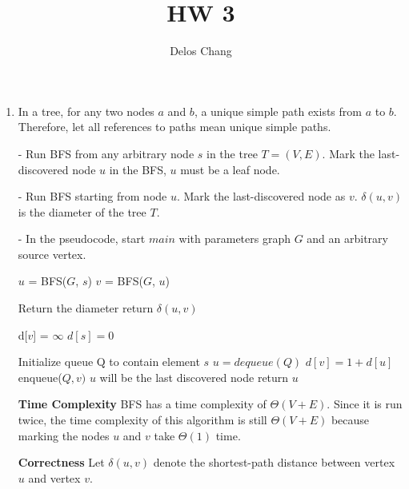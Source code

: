 \documentclass[a4paper]{report}
\title{HW 3}
\author{Delos Chang}
\date{}
\begin{document}
  \begin{enumerate}
    \item
      In a tree, for any two nodes $a$ and $b$, a unique simple path exists from $a$ to $b$. Therefore, let all references to paths
      mean unique simple paths. 

      - Run BFS from any arbitrary node $s$ in the tree $T=(V,E)$. Mark the last-discovered node $u$ in the BFS, 
      $u$ must be a leaf node. 

      - Run BFS starting from node $u$. Mark the last-discovered node as $v$.
      $\delta(u, v)$ is the diameter of the tree $T$. 

      - In the pseudocode, start $main$ with parameters graph $G$ and an arbitrary source vertex.

      \begin{algorithmic}[1]
      \State $u$ = BFS($G$, $s$)
      \State $v$ = BFS($G$, $u$)

      \Comment Return the diameter
      \State return $\delta(u,v)$
    \EndFunction

    \end{algorithmic}
      \begin{algorithmic}[1]
        \State d[$v$] = $\infty$
      \EndFor
      \State $d[s] = 0$

      \State Initialize queue Q to contain element $s$
        \State $u = dequeue(Q)$
            \State $d[v] = 1 + d[u]$
            \State enqueue($Q,v)$
          \EndIf
        \EndFor
      \EndWhile
      \Comment $u$ will be the last discovered node
      \State return $u$

    \EndFunction
    \end{algorithmic}

      {\bf Time Complexity }
      BFS has a time complexity of $\Theta(V+E)$. Since it is run twice, the time complexity of this algorithm is still $\Theta(V+E)$ because 
      marking the nodes $u$ and $v$ take $\Theta(1)$ time.


      {\bf Correctness}
      Let $\delta(u,v)$ denote the shortest-path distance between vertex $u$ and vertex $v$.


\end{enumerate}
\end{document}
